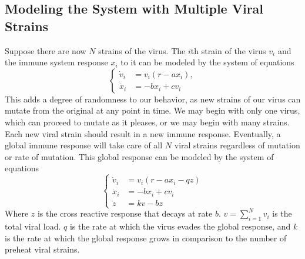 \documentclass{article}
\begin{document}
\subsection{Modeling the System with Multiple Viral Strains}
Suppose there are now $N$ strains of the virus.  The $i$th strain of the virus $v_i$ and the immune system response $x_i$ to it can be modeled by the system of equations
\begin{equation}
    \begin{cases}
        \dot v_i &= v_i(r - ax_i), \\
        \dot x_i &= -bx_i + cv_i
    \end{cases}
\end{equation}
This adds a degree of randomness to our behavior, as new strains of our virus can mutate from the original at any point in time. We may begin with only one virus, which can proceed to mutate as it pleases, or we may begin with many strains. Each new viral strain should result in a new immune response. Eventually, a global immune response will take care of all $N$ viral strains regardless of mutation or rate of mutation. This global response can be modeled by the system of equations
\begin{equation}
    \begin{cases}
        \dot v_i &= v_i(r - ax_i - qz) \\
        \dot x_i &= -bx_i + cv_i \\
        \dot z &= kv - bz
    \end{cases}
\end{equation}
Where $z$ is the cross reactive response that decays at rate $b$.  $v = \sum^{N}_{i=1} v_i$ is the total viral load. $q$ is the rate at which the virus evades the global response, and $k$ is the rate at which the global response grows in comparison to the number of preheat viral strains.
\end{document}
